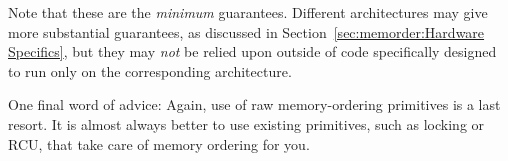 Note that these are the \emph{minimum} guarantees.
Different architectures may give
more substantial guarantees,
as discussed in Section~\ref{sec:memorder:Hardware Specifics},
but they may \emph{not}
be relied upon outside of code specifically designed to run only on
the corresponding architecture.

One final word of advice: Again, use of raw memory-ordering primitives is
a last resort.
It is almost always better to use existing primitives, such as locking
or RCU, that take care of memory ordering for you.
